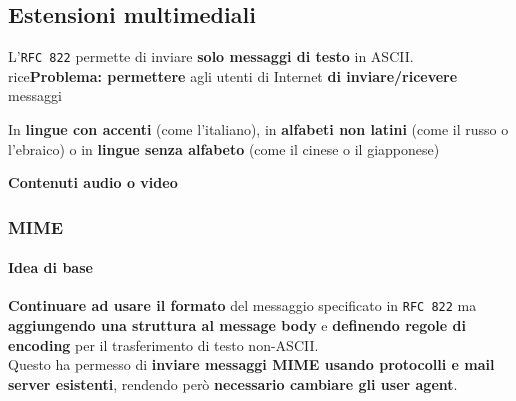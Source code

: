 \documentclass[10pt]{article}
\begin{document}
\subsection{Estensioni multimediali}
L'\texttt{RFC 822} permette di inviare \textbf{solo messaggi di testo} in ASCII. rice\textbf{Problema: permettere} agli utenti di Internet \textbf{di inviare/ricevere} messaggi
\begin{list}{}{}
\item In \textbf{lingue con accenti} (come l'italiano), in \textbf{alfabeti non latini} (come il russo o l'ebraico) o in \textbf{lingue senza alfabeto} (come il cinese o il giapponese)
\item \textbf{Contenuti audio o video}
\end{list}
\subsubsection{MIME}
\paragraph{Idea di base} \textbf{Continuare ad usare il formato} del messaggio specificato in \texttt{RFC 822} ma \textbf{aggiungendo una struttura al message body} e \textbf{definendo regole di encoding} per il trasferimento di testo non-ASCII.\\
Questo ha permesso di \textbf{inviare messaggi MIME usando protocolli e mail server esistenti}, rendendo però \textbf{necessario cambiare gli user agent}.
\end{document}
